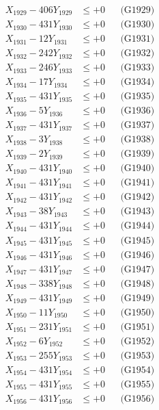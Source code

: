 \documentclass[a4paper,10pt]{article}
\begin{document}
{\begin{align}
X_{1929} - 406Y_{1929} &\leq +0 && \text{(G1929)} \\
X_{1930} - 431Y_{1930} &\leq +0 && \text{(G1930)} \\
\allowbreak
X_{1931} - 12Y_{1931} &\leq +0 && \text{(G1931)} \\
X_{1932} - 242Y_{1932} &\leq +0 && \text{(G1932)} \\
X_{1933} - 246Y_{1933} &\leq +0 && \text{(G1933)} \\
X_{1934} - 17Y_{1934} &\leq +0 && \text{(G1934)} \\
X_{1935} - 431Y_{1935} &\leq +0 && \text{(G1935)} \\
X_{1936} - 5Y_{1936} &\leq +0 && \text{(G1936)} \\
X_{1937} - 431Y_{1937} &\leq +0 && \text{(G1937)} \\
X_{1938} - 3Y_{1938} &\leq +0 && \text{(G1938)} \\
X_{1939} - 2Y_{1939} &\leq +0 && \text{(G1939)} \\
X_{1940} - 431Y_{1940} &\leq +0 && \text{(G1940)} \\
\allowbreak
X_{1941} - 431Y_{1941} &\leq +0 && \text{(G1941)} \\
X_{1942} - 431Y_{1942} &\leq +0 && \text{(G1942)} \\
X_{1943} - 38Y_{1943} &\leq +0 && \text{(G1943)} \\
X_{1944} - 431Y_{1944} &\leq +0 && \text{(G1944)} \\
X_{1945} - 431Y_{1945} &\leq +0 && \text{(G1945)} \\
X_{1946} - 431Y_{1946} &\leq +0 && \text{(G1946)} \\
X_{1947} - 431Y_{1947} &\leq +0 && \text{(G1947)} \\
X_{1948} - 338Y_{1948} &\leq +0 && \text{(G1948)} \\
X_{1949} - 431Y_{1949} &\leq +0 && \text{(G1949)} \\
X_{1950} - 11Y_{1950} &\leq +0 && \text{(G1950)} \\
\allowbreak
X_{1951} - 231Y_{1951} &\leq +0 && \text{(G1951)} \\
X_{1952} - 6Y_{1952} &\leq +0 && \text{(G1952)} \\
X_{1953} - 255Y_{1953} &\leq +0 && \text{(G1953)} \\
X_{1954} - 431Y_{1954} &\leq +0 && \text{(G1954)} \\
X_{1955} - 431Y_{1955} &\leq +0 && \text{(G1955)} \\
X_{1956} - 431Y_{1956} &\leq +0 && \text{(G1956)} \\

\end{align}}
\end{document}
